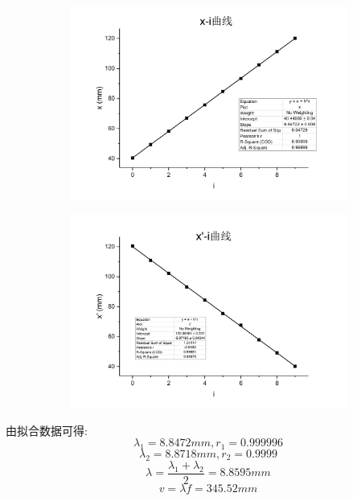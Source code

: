 \documentclass{article}
\begin{document}
    \begin{figure}[h]
        \begin{center}
            \begin{subfigure}{0.48\textwidth}
                \includegraphics[width=\textwidth]{x-i curve.jpg}
            \end{subfigure}
            \begin{subfigure}{0.48\textwidth}
                \includegraphics[width=\textwidth]{x'-i curve.jpg}
            \end{subfigure}
        \end{center}
    \end{figure}

    由拟合数据可得:
    $$\lambda_1=8.8472mm,r_1=0.999996$$
    $$\lambda_2=8.8718mm,r_2=0.9999$$
    $$\lambda=\frac{\lambda_1+\lambda_2}{2}=8.8595mm$$
    $$v=\lambda f=345.52mm$$
\end{document}
